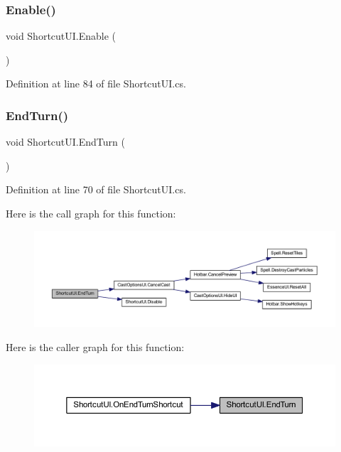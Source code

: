 \subsubsection{\texorpdfstring{Enable()}{Enable()}}
{\footnotesize\ttfamily void Shortcut\+U\+I.\+Enable (\begin{DoxyParamCaption}{ }\end{DoxyParamCaption})}



Definition at line 84 of file Shortcut\+U\+I.\+cs.

\mbox{\label{class_shortcut_u_i_ab2181e3a43736c065ce2ff0d8066903e}} 
\subsubsection{\texorpdfstring{EndTurn()}{EndTurn()}}
{\footnotesize\ttfamily void Shortcut\+U\+I.\+End\+Turn (\begin{DoxyParamCaption}{ }\end{DoxyParamCaption})}



Definition at line 70 of file Shortcut\+U\+I.\+cs.

Here is the call graph for this function\+:
\nopagebreak
\begin{figure}[H]
\begin{center}
\leavevmode
\includegraphics[width=350pt]{class_shortcut_u_i_ab2181e3a43736c065ce2ff0d8066903e_cgraph}
\end{center}
\end{figure}
Here is the caller graph for this function\+:
\nopagebreak
\begin{figure}[H]
\begin{center}
\leavevmode
\includegraphics[width=350pt]{class_shortcut_u_i_ab2181e3a43736c065ce2ff0d8066903e_icgraph}
\end{center}
\end{figure}
\mbox{\label{class_shortcut_u_i_a2434bf0b041a115161fda12022d69f0b}} 
